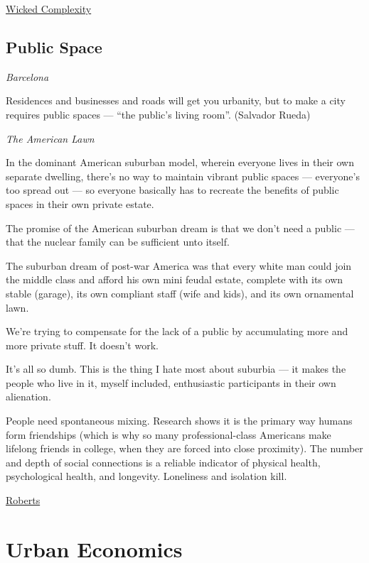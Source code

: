 \documentclass[
]{book}
\begin{document}
\href{https://mahb.stanford.edu/blog/thresholds-cascades-and-wicked-problems/}{Wicked Complexity}

\hypertarget{public-space}{%
\section{Public Space}\label{public-space}}

\emph{Barcelona}

Residences and businesses and roads will get you urbanity,
but to make a city requires public spaces --- ``the public's living room''.
(Salvador Rueda)

\emph{The American Lawn}

In the dominant American suburban model, wherein everyone lives in their own separate dwelling, there's no way to maintain vibrant public spaces --- everyone's too spread out --- so everyone basically has to recreate the benefits of public spaces in their own private estate.

The promise of the American suburban dream is that we don't need a public --- that the nuclear family can be sufficient unto itself.

The suburban dream of post-war America was that every white man could join the middle class and afford his own mini feudal estate, complete with its own stable (garage), its own compliant staff (wife and kids), and its own ornamental lawn.

We're trying to compensate for the lack of a public by accumulating more and more private stuff.
It doesn't work.

It's all so dumb. This is the thing I hate most about suburbia --- it makes the people who live in it, myself included, enthusiastic participants in their own alienation.

People need spontaneous mixing. Research shows it is the primary way humans form friendships (which is why so many professional-class Americans make lifelong friends in college, when they are forced into close proximity). The number and depth of social connections is a reliable indicator of physical health, psychological health, and longevity. Loneliness and isolation kill.

\href{https://www.volts.wtf/p/a-rant-about-lawns-in-america}{Roberts}

\hypertarget{urban-economics}{%
\chapter{Urban Economics}\label{urban-economics}}
\end{document}
